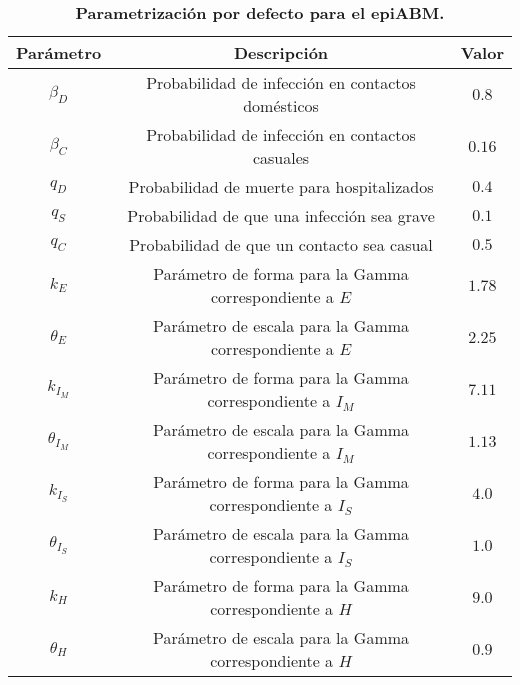 \begin{table}[!ht]
    \centering
    \caption{\textbf{Parametrización por defecto para el epiABM.}}
    \label{table:default_params}
    \begin{tabular}{|c|c|c|}
      \hline
      Parámetro & Descripción & Valor \\ \hline
      $\beta_D$      & Probabilidad de infección en contactos domésticos               & $0.8$ \\ \hline
      $\beta_C$      & Probabilidad de infección en contactos casuales                 & $0.16$ \\ \hline
      $q_D$          & Probabilidad de muerte para hospitalizados          & $0.4$ \\ \hline
      $q_S$          & Probabilidad de que una infección sea grave              & $0.1$ \\ \hline
      $q_C$          & Probabilidad de que un contacto sea casual                   & $0.5$ \\ \hline
      $k_{E}$        & Parámetro de forma para la Gamma correspondiente a $E$   & $1.78$ \\ \hline
      $\theta_{E}$   & Parámetro de escala para la Gamma correspondiente a  $E$   & $2.25$ \\ \hline
      $k_{I_M}$      & Parámetro de forma para la Gamma correspondiente a  $I_M$ & $7.11$ \\ \hline
      $\theta_{I_M}$ & Parámetro de escala para la Gamma correspondiente a  $I_M$ & $1.13$ \\ \hline
      $k_{I_S}$      & Parámetro de forma para la Gamma correspondiente a  $I_S$ & $4.0$ \\ \hline
      $\theta_{I_S}$ & Parámetro de escala para la Gamma correspondiente a  $I_S$ & $1.0$ \\ \hline
      $k_{H}$        & Parámetro de forma para la Gamma correspondiente a  $H$   & $9.0$ \\ \hline
      $\theta_{H}$   & Parámetro de escala para la Gamma correspondiente a  $H$   & $0.9$ \\ \hline
    \end{tabular}
  \end{table}
